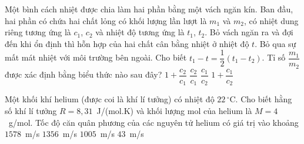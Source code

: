 	\begin{ex}%
		Một bình cách nhiệt được chia làm hai phần bằng một vách ngăn kín. Ban đầu, hai phần có chứa hai chất lỏng có khối lượng lần lượt là $m_1$ và $m_2$, có nhiệt dung riêng tương ứng là $c_1$, $c_2$ và nhiệt độ tương ứng là $t_1$, $t_2$. Bỏ vách ngăn ra và đợi đến khi ổn định thì hỗn hợp của hai chất cân bằng nhiệt ở nhiệt độ $t$. Bỏ qua sự mất mát nhiệt với môi trường bên ngoài. Cho biết $t_1-t=\dfrac{1}{2}\left(t_1-t_2\right)$. Tỉ số $\dfrac{m_1}{m_2}$ được xác định bằng biểu thức nào sau đây?
		\choice
		{$1+\dfrac{c_2}{c_1}$}
		{\True $\dfrac{c_2}{c_1}$}
		{$\dfrac{c_1}{c_2}$}
		{$1+\dfrac{c_1}{c_2}$}
	\end{ex}

	\begin{ex}%
		Một khối khí helium (được coi là khí lí tưởng) có nhiệt độ $22\,^\circ\text{C}$. Cho biết hằng số khí lí tưởng $R=8{,}31$~J/(mol.K) và khối lượng mol của helium là $M=4$~g/mol. Tốc độ căn quân phương của các nguyên tử helium có giá trị vào khoảng
		\choice
		{$1578$~m/s}
		{\True $1356$~m/s}
		{$1005$~m/s}
		{$43$~m/s}
	\end{ex}

